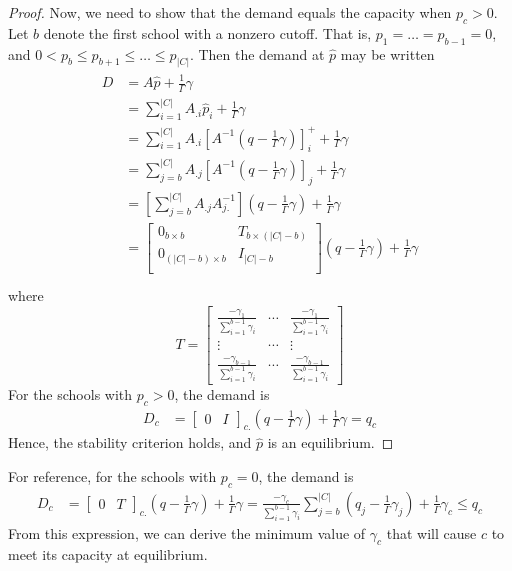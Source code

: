 \documentclass[12pt]{article}
\theoremstyle{definition}
\begin{document}
\begin{proof}
Now, we need to show that the demand equals the capacity when $p_c > 0$. Let $b$ denote the first school with a nonzero cutoff. That is, $p_1 = \dots = p_{b-1} = 0$, and $0 < p_b \leq p_{b+1} \leq \dots \leq p_{|C|}$. Then the demand at $\hat p$ may be written
\begin{gather*}\begin{aligned}
D &= A \hat p + \frac{1}{\Gamma}\gamma \\
&= \sum_{i=1}^{|C|} A_{.i} \hat p_i + \frac{1}{\Gamma}\gamma  \\
&= \sum_{i=1}^{|C|} A_{.i} \left[A^{-1} \left(q - \frac{1}{\Gamma}\gamma\right) \right]_i^+ + \frac{1}{\Gamma}\gamma  \\
&= \sum_{j=b}^{|C|} A_{.j} \left[A^{-1} \left(q - \frac{1}{\Gamma}\gamma\right) \right]_j + \frac{1}{\Gamma}\gamma  \\
&= \left[\sum_{j=b}^{|C|} A_{.j} A_{j.}^{-1} \right] \left(q - \frac{1}{\Gamma}\gamma\right) + \frac{1}{\Gamma}\gamma  \\
&= \begin{bmatrix}
0_{b \times b} & T_{b \times (|C| - b)} \\
0_{(|C| - b) \times b} & I_{|C| - b} \\
\end{bmatrix} \left(q - \frac{1}{\Gamma}\gamma\right) + \frac{1}{\Gamma}\gamma  \\
\end{aligned}\end{gather*}
where
\[T = \begin{bmatrix}
\frac{-\gamma_1}{\sum_{i=1}^{b-1} \gamma_i} & \cdots & \frac{-\gamma_1}{\sum_{i=1}^{b-1} \gamma_i} \\
\vdots & \cdots & \vdots \\
\frac{-\gamma_{b-1}}{\sum_{i=1}^{b-1} \gamma_i} & \cdots & \frac{-\gamma_{b-1}}{\sum_{i=1}^{b-1} \gamma_i}
\end{bmatrix}\]
For the schools with $p_c > 0$, the demand is
\begin{align*}
D_c &=
\begin{bmatrix}
0& I
\end{bmatrix}_{c.} \left(q - \frac{1}{\Gamma}\gamma\right) + \frac{1}{\Gamma}\gamma
= q_c
\end{align*}
Hence, the stability criterion holds, and $\hat p$ is an equilibrium.\end{proof}

For reference, for the schools with $p_c = 0$, the demand is 
\begin{align*}
D_c &=
\begin{bmatrix}
0& T
\end{bmatrix}_{c.} \left(q - \frac{1}{\Gamma}\gamma\right) + \frac{1}{\Gamma}\gamma  
= \frac{-\gamma_c}{\sum_{i=1}^{b-1} \gamma_i} \sum_{j=b}^{|C|} \left(q_j - \frac{1}{\Gamma}\gamma_j\right)  + \frac{1}{\Gamma}\gamma_c \leq q_c
\end{align*}
From this expression, we can derive the minimum value of $\gamma_c$ that will cause $c$ to meet its capacity at equilibrium. 
\end{document}
